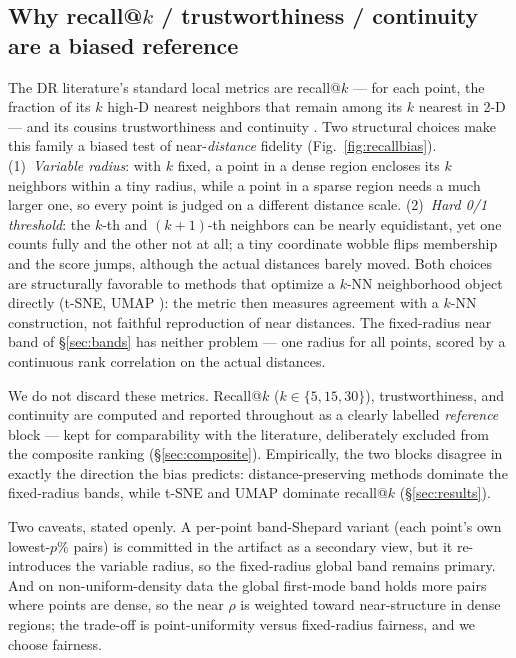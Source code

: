 \documentclass[11pt]{article}
\begin{document}
\subsection{Why recall@$k$ / trustworthiness / continuity are a biased reference}
\label{sec:recallbias}

The DR literature's standard local metrics are recall@$k$ --- for each point,
the fraction of its $k$ high-D nearest neighbors that remain among its $k$
nearest in 2-D --- and its cousins trustworthiness and continuity
\cite{venna2006trustworthiness,lee2009qualityassessment}. Two structural
choices make this family a biased test of near-\emph{distance} fidelity
(Fig.~\ref{fig:recallbias}). (1)~\emph{Variable radius}: with $k$ fixed, a
point in a dense region encloses its $k$ neighbors within a tiny radius,
while a point in a sparse region needs a much larger one, so every point is
judged on a different distance scale. (2)~\emph{Hard 0/1 threshold}: the
$k$-th and $(k{+}1)$-th neighbors can be nearly equidistant, yet one counts
fully and the other not at all; a tiny coordinate wobble flips membership and
the score jumps, although the actual distances barely moved. Both choices are
structurally favorable to methods that optimize a $k$-NN neighborhood object
directly (t-SNE, UMAP \cite{vandermaaten2008tsne,mcinnes2018umap}): the
metric then measures agreement with a $k$-NN construction, not faithful
reproduction of near distances. The fixed-radius near band of
\S\ref{sec:bands} has neither problem --- one radius for all points, scored
by a continuous rank correlation on the actual distances.

We do not discard these metrics. Recall@$k$ ($k \in \{5,15,30\}$),
trustworthiness, and continuity are computed and reported throughout as a
clearly labelled \emph{reference} block --- kept for comparability with the
literature, deliberately excluded from the composite ranking
(\S\ref{sec:composite}). Empirically, the two blocks disagree in exactly the
direction the bias predicts: distance-preserving methods dominate the
fixed-radius bands, while t-SNE and UMAP dominate recall@$k$
(\S\ref{sec:results}).

Two caveats, stated openly. A per-point band-Shepard variant (each point's
own lowest-$p\%$ pairs) is committed in the artifact as a secondary view, but
it re-introduces the variable radius, so the fixed-radius global band remains
primary. And on non-uniform-density data the global first-mode band holds
more pairs where points are dense, so the near $\rho$ is weighted toward
near-structure in dense regions; the trade-off is point-uniformity versus
fixed-radius fairness, and we choose fairness.
\end{document}
